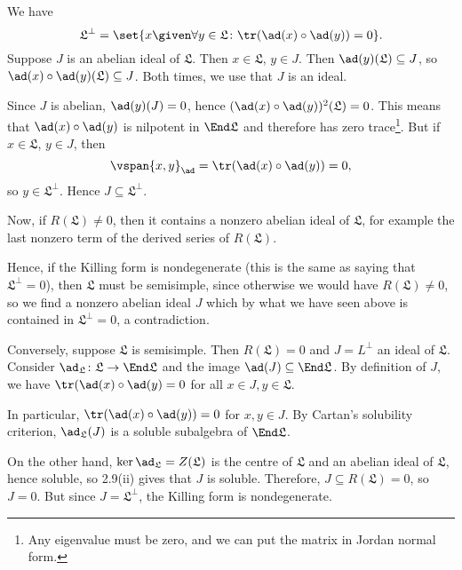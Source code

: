 We have
\[  \mathfrak{L}^\perp = \set{x\given\forall y \in \mathfrak{L}\colon \tr(\ad(x) \circ \ad(y)) = 0}. \]
Suppose $J$ is an abelian ideal of $\mathfrak{L}$. Then $x \in \mathfrak{L}$,
$y \in J$. Then $\ad(y)(\mathfrak{L}) \subseteq J$, so $\ad(x) \circ \ad(y)(\mathfrak{L}) \subseteq J$.
Both times, we use that $J$ is an ideal.

Since $J$ is abelian, $\ad(y)(J) = 0$, hence $(\ad(x) \circ \ad(y))^2(\mathfrak{L}) = 0$.
This means that $\ad(x) \circ \ad(y)$ is nilpotent in $\End \mathfrak{L}$ and therefore
has zero trace\footnote{Any eigenvalue must be zero, and we can put the matrix
in Jordan normal form.}. But if $x \in \mathfrak{L}$, $y \in J$, then
\[ \vspan{x, y}_{\ad} = \tr(\ad(x) \circ \ad(y)) = 0, \]
so $y \in \mathfrak{L}^{\perp}$. Hence $J \subseteq \mathfrak{L}^\perp$.

Now, if $R(\mathfrak{L})\neq 0$, then it contains a nonzero abelian ideal of $\mathfrak{L}$,
for example the last nonzero term of the derived series of $R(\mathfrak{L})$.

Hence, if the Killing form is nondegenerate (this is the same as saying that
$\mathfrak{L}^\perp = 0$), then $\mathfrak{L}$ must be semisimple, since otherwise
we would have $R(\mathfrak{L})\neq 0$, so we find a nonzero abelian ideal $J$ which
by what we have seen above is contained in $\mathfrak{L}^\perp = 0$, a contradiction.

Conversely, suppose $\mathfrak{L}$ is semisimple. Then $R(\mathfrak{L}) = 0$ and
$J = L^\perp$ an ideal of $\mathfrak{L}$. Consider $\ad_{\mathfrak{L}}\colon \mathfrak{L} \to \End\mathfrak{L}$ and
the image $\ad(J) \subseteq \End \mathfrak{L}$. By definition of $J$, we have
$\tr(\ad(x)\circ \ad(y) = 0$ for all $x \in J, y \in\mathfrak{L}$.

In particular, $\tr(\ad(x) \circ \ad(y)) = 0$ for $x, y \in J$.
By Cartan's solubility criterion, $\ad_{\mathfrak{L}}(J)$ is a soluble subalgebra
of $\End\mathfrak{L}$.

On the other hand, $\ker\ad_{\mathfrak{L}} = Z(\mathfrak{L})$ is the centre of
$\mathfrak{L}$ and an abelian ideal of $\mathfrak{L}$, hence soluble, so
2.9(ii) gives that $J$ is soluble. Therefore, $J \subseteq R(\mathfrak{L}) = 0$, so
$J = 0$. But since $J = \mathfrak{L}^\perp$, the Killing form is nondegenerate.
